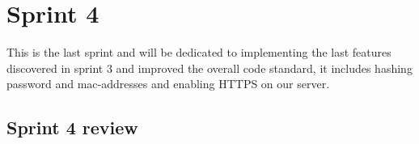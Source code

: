 \chapter{Sprint 4}
This is the last sprint and will be dedicated to implementing the last features discovered in sprint 3 and improved the overall code standard, it includes hashing password and mac-addresses and enabling HTTPS on our server. %







\section{Sprint 4 review}